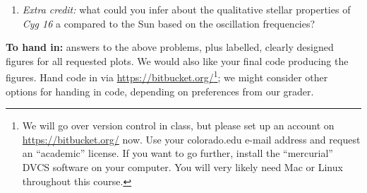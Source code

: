 \begin{description}
\begin{enumerate}
     \item \emph{Extra credit:} what could you infer about the
     qualitative stellar properties of \emph{Cyg 16 }a compared to the Sun based on the
     oscillation frequencies?

\end{enumerate}

\textbf{To hand in:} answers to the above problems, plus labelled,
clearly designed figures for all requested plots.  
We would also like your final code producing the figures.  Hand code in via
\href{bitbucket.org}{https://bitbucket.org/}\footnote{We will go over
  version control in class, but please set up an account on
  \href{bitbucket.org}{https://bitbucket.org/} now.   Use your
  colorado.edu e-mail address and request an ``academic'' license.
If you want to go further, install the ``mercurial'' DVCS software on
your computer.  You will very likely need Mac or Linux throughout this
course.}; we might consider other options for handing in code,
depending on preferences from our grader.

\end{description}




